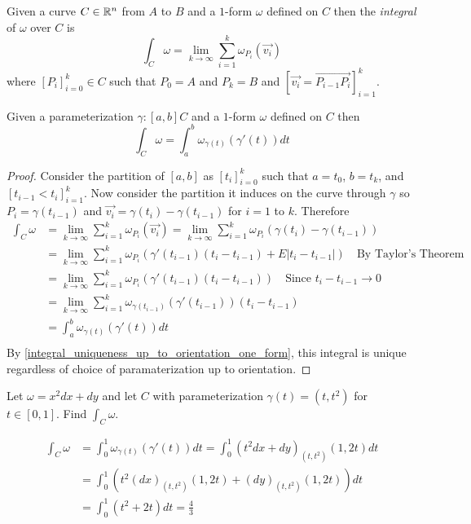 \documentclass[notes.tex]{subfiles}
\begin{document}
\begin{definition}
    Given a curve $C \in \mathbb{R}^n$ from $A$ to $B$ and a $1$-form $\omega$ defined on $C$ then the \textit{integral} of $\omega$ over $C$ is
    \[
        \int_C \omega = \lim_{k\to\infty} \sum_{i = 1}^k \omega_{P_i}(\vec{v_i})
    \]
    where $[P_i]_{i = 0}^k \in C$ such that $P_0 = A$ and $P_k = B$ and $[\vec{v_i} = \overrightarrow{P_{i - 1}P_i}]_{i = 1}^k$.
\end{definition}

\begin{theorem}
    Given a parameterization $\gamma\colon [a, b] C$ and a $1$-form $\omega$ defined on $C$ then
    \[
        \int_C \omega = \int_a^b \omega_{\gamma(t)}(\gamma'(t))dt
    \]
\end{theorem}
\begin{proof}
    Consider the partition of $[a, b]$ as $[t_i]_{i = 0}^k$ such that $a = t_0$, $b = t_k$, and $[t_{i - 1} < t_i]_{i = 1}^k$. Now consider the partition it induces on the curve through $\gamma$ so $P_i = \gamma(t_{i - 1})$ and $\vec{v_i} = \gamma(t_i) - \gamma(t_{i - 1})$ for $i = 1$ to $k$. Therefore
    \begin{align*}
        \int_C \omega
        &= \lim_{k\to\infty} \sum_{i = 1}^k \omega_{P_i}(\vec{v_i})
        = \lim_{k\to\infty} \sum_{i = 1}^k \omega_{P_i}(\gamma(t_i) - \gamma(t_{i - 1})) \\
        &= \lim_{k\to\infty} \sum_{i = 1}^k \omega_{P_i}(\gamma'(t_{i - 1})(t_i - t_{i -1}) + E|t_i - t_{i - 1}|) \quad \text{By Taylor's Theorem} \\
        &= \lim_{k\to\infty} \sum_{i = 1}^k \omega_{P_i}(\gamma'(t_{i - 1})(t_i - t_{i -1})) \quad \text{Since $t_i - t_{i - 1} \to 0$} \\
        &= \lim_{k\to\infty} \sum_{i = 1}^k \omega_{\gamma(t_{i - 1})}(\gamma'(t_{i - 1}))(t_i - t_{i -1}) \\
        &= \int_a^b \omega_{\gamma(t)}(\gamma'(t))dt \\
    \end{align*}
    By \cref{integral_uniqueness_up_to_orientation_one_form}, this integral is unique regardless of choice of paramaterization up to orientation.
\end{proof}

\begin{exercise}
    Let $\omega = x^2dx + dy$ and let $C$ with parameterization $\gamma(t) = (t, t^2)$ for $t \in [0, 1]$. Find $\int_C \omega$.
\end{exercise}
\begin{solution}
    \begin{align*}
        \int_C \omega
        &= \int_0^1 \omega_{\gamma(t)}(\gamma'(t))dt
        = \int_0^1 (t^2dx + dy)_{(t, t^2)}(1, 2t)dt \\
        &= \int_0^1 (t^2(dx)_{(t, t^2)}(1,2 t) + (dy)_{(t, t^2)}(1, 2t))dt \\
        &= \int_0^1 (t^2 + 2t)dt
        = \frac{4}{3}
    \end{align*}
\end{solution}
\end{document}
